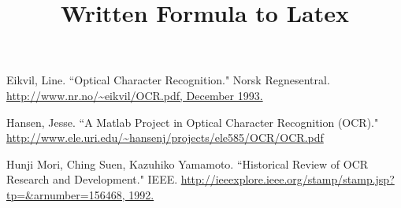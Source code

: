 \documentclass{article}
\begin{document}
\sloppy
\fboxsep=0cm
\title{Written Formula to Latex}

\address{Rose-Hulman Institute of Technology}
\maketitle

%

%

%

%

%



\begin{thebibliography}{1}

   Eikvil, Line. ``Optical Character Recognition." Norsk 		Regnesentral. \url{http://www.nr.no/~eikvil/OCR.pdf, December 1993.}

   Hansen, Jesse.  ``A Matlab Project in Optical Character Recognition (OCR)." \url{http://www.ele.uri.edu/~hansenj/projects/ele585/OCR/OCR.pdf}

    Hunji Mori, Ching Suen, Kazuhiko Yamamoto. ``Historical Review of OCR Research and Development." IEEE. \url{http://ieeexplore.ieee.org/stamp/stamp.jsp?tp=&arnumber=156468, 1992.}
\end{thebibliography}
\end{document}
